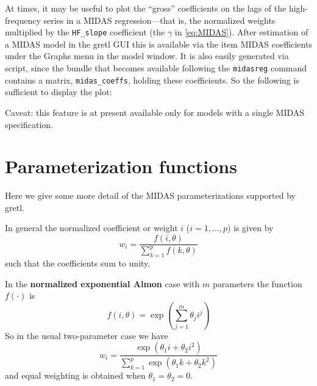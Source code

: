 At times, it may be useful to plot the ``gross'' coefficients on the
lags of the high-frequency series in a MIDAS regression---that is, the
normalized weights multiplied by the \texttt{HF\_slope} coefficient
(the $\gamma$ in \ref{eq:MIDAS}). After estimation of a MIDAS model in
the gretl GUI this is available via the item \textsf{MIDAS
  coefficients} under the \textsf{Graphs} menu in the model window. It
is also easily generated via script, since the  bundle
that becomes available following the \texttt{midasreg} command
contains a matrix, \texttt{midas\_coeffs}, holding these
coefficients. So the following is sufficient to display the plot:
%

Caveat: this feature is at present available only for models with a
single MIDAS specification.

\section{Parameterization functions}
\label{sec:midas-param}

Here we give some more detail of the MIDAS parameterizations supported
by gretl.

\vspace{1ex}

In general the normalized coefficient or weight $i$ ($i=1,\ldots,p$)
is given by
\begin{equation}
\label{eq:MIDASgeneral}
  w_i = \frac{f(i,\theta)}
  {\sum_{k=1}^pf(k,\theta)}
\end{equation}
such that the coefficients sum to unity.

In the \textbf{normalized exponential Almon} case with $m$ parameters
the function $f(\cdot)$ is
\begin{equation}
f(i,\theta) = \exp\left(\sum_{j=1}^m \theta_j i^j\right)
\end{equation}
So in the usual two-parameter case we have
\[
w_i =
  \frac{\exp\left(\theta_1 i + \theta_2 i^2\right)}
  {\sum_{k=1}^p \exp\left(\theta_1 k + \theta_2 k^2\right)}
\]
and equal weighting is obtained when $\theta_1 = \theta_2 = 0$.

\vspace{1ex}

